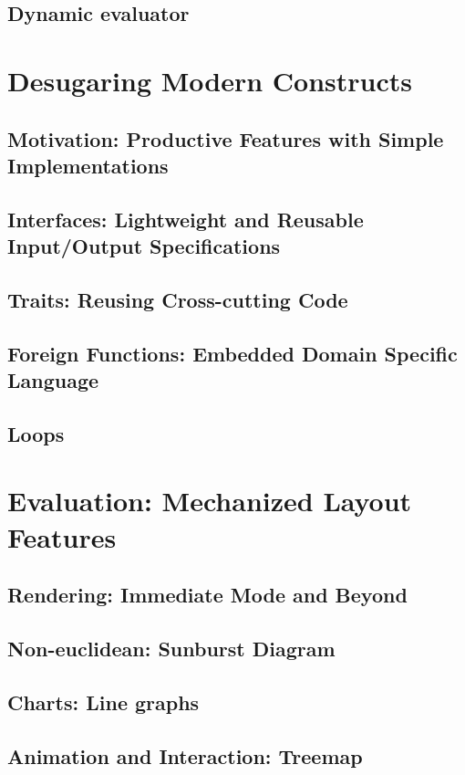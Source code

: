 \subsection{Dynamic evaluator}

\section{Desugaring Modern Constructs}
\subsection{Motivation: Productive Features with Simple Implementations}
\subsection{Interfaces: Lightweight and Reusable Input/Output Specifications}
\subsection{Traits: Reusing Cross-cutting Code}
\subsection{Foreign Functions: Embedded Domain Specific Language}
\subsection{Loops}

\section{Evaluation: Mechanized Layout Features}

\subsection{Rendering: Immediate Mode and Beyond}
\subsection{Non-euclidean: Sunburst Diagram}
\subsection{Charts: Line graphs}
\subsection{Animation and Interaction: Treemap}
